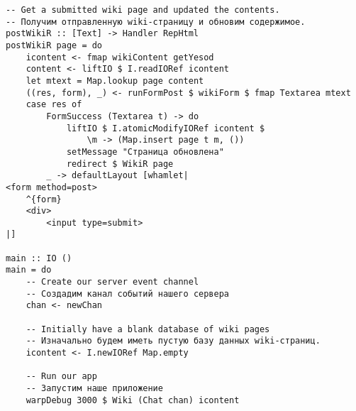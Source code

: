 \begin{lstlisting}
-- Get a submitted wiki page and updated the contents.
-- Получим отправленную wiki-страницу и обновим содержимое.
postWikiR :: [Text] -> Handler RepHtml
postWikiR page = do
    icontent <- fmap wikiContent getYesod
    content <- liftIO $ I.readIORef icontent
    let mtext = Map.lookup page content
    ((res, form), _) <- runFormPost $ wikiForm $ fmap Textarea mtext
    case res of
        FormSuccess (Textarea t) -> do
            liftIO $ I.atomicModifyIORef icontent $
                \m -> (Map.insert page t m, ())
            setMessage "Страница обновлена"
            redirect $ WikiR page
        _ -> defaultLayout [whamlet|
<form method=post>
    ^{form}
    <div>
        <input type=submit>
|]

main :: IO ()
main = do
    -- Create our server event channel
    -- Создадим канал событий нашего сервера
    chan <- newChan

    -- Initially have a blank database of wiki pages
    -- Изначально будем иметь пустую базу данных wiki-страниц.
    icontent <- I.newIORef Map.empty

    -- Run our app
    -- Запустим наше приложение
    warpDebug 3000 $ Wiki (Chat chan) icontent
\end{lstlisting}
